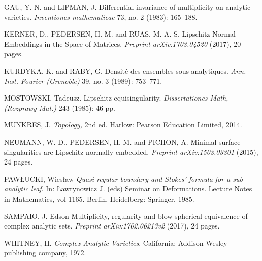\documentclass{amsart}
\begin{document}
\begin{thebibliography}{00}
{GAU, Y.-N. and LIPMAN, J.}
{Differential invariance of multiplicity on analytic varieties}.
{\it Inventiones mathematicae} 73, no. 2 (1983): 165--188.

{KERNER, D., PEDERSEN, H. M. and RUAS, M. A. S.}
{Lipschitz Normal Embeddings in the Space of Matrices}.
{\it Preprint arXiv:1703.04520} (2017), 20 pages.

{KURDYKA, K. and RABY, G.}
{ Densit\'e des ensembles sous-analytiques}.
{\it Ann. Inst. Fourier (Grenoble)} 39, no. 3 (1989): 753--771.

{MOSTOWSKI, Tadeusz.}
{Lipschitz equisingularity}.
{\it Dissertationes Math, (Rozprawy Mat.)} 243 (1985): 46 pp.
  
{MUNKRES, J.}
{\em Topology,}
2nd ed. Harlow: Pearson Education Limited, 2014.

{NEUMANN, W. D., PEDERSEN, H. M.  and PICHON, A.}
{Minimal surface singularities are Lipschitz normally embedded.}
{\it Preprint arXiv:1503.03301} (2015), 24 pages.

PAW\L UCKI, Wies\l aw
{\em Quasi-regular boundary and Stokes' formula for a sub-analytic leaf}.
In: \L awrynowicz J. (eds) Seminar on Deformations. Lecture Notes in Mathematics, vol 1165. Berlin, Heidelberg: Springer. 1985.

{SAMPAIO, J. Edson}
{Multiplicity, regularity and blow-spherical equivalence of complex analytic sets.}
{\it Preprint arXiv:1702.06213v2} (2017), 24 pages.

{WHITNEY, H.}
{\em Complex Analytic Varieties}.
California: Addison-Wesley publishing company, 1972.
\end{thebibliography}
\end{document}
